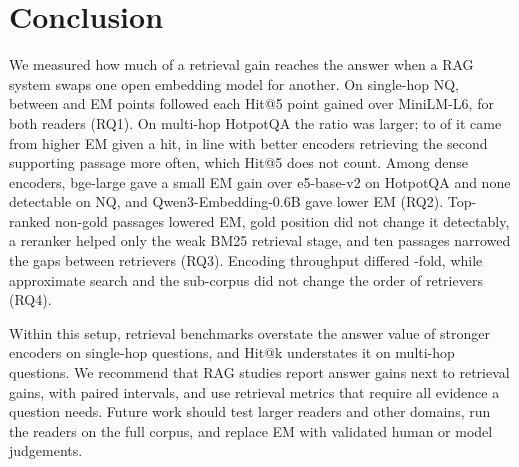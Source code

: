 \section{Conclusion}\label{sec:conclusion}

We measured how much of a retrieval gain reaches the answer when a RAG system swaps one open embedding model for another. On single-hop NQ, between  and  EM points followed each Hit@5 point gained over MiniLM-L6, for both readers (RQ1). On multi-hop HotpotQA the ratio was larger;  to  of it came from higher EM given a hit, in line with better encoders retrieving the second supporting passage more often, which Hit@5 does not count. Among dense encoders, bge-large gave a small EM gain over e5-base-v2 on HotpotQA and none detectable on NQ, and Qwen3-Embedding-0.6B gave lower EM (RQ2). Top-ranked non-gold passages lowered EM, gold position did not change it detectably, a reranker helped only the weak BM25 retrieval stage, and ten passages narrowed the gaps between retrievers (RQ3). Encoding throughput differed -fold, while approximate search and the sub-corpus did not change the order of retrievers (RQ4).

Within this setup, retrieval benchmarks overstate the answer value of stronger encoders on single-hop questions, and Hit@k understates it on multi-hop questions. We recommend that RAG studies report answer gains next to retrieval gains, with paired intervals, and use retrieval metrics that require all evidence a question needs. Future work should test larger readers and other domains, run the readers on the full corpus, and replace EM with validated human or model judgements.
